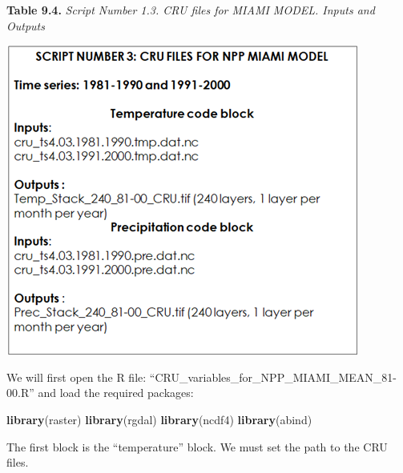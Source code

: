 \documentclass[
  10pt,
  b5paper,
]{book}
\newenvironment{Shaded}{\begin{snugshade}}{\end{snugshade}}
\newcommand{\KeywordTok}[1]{\textcolor[rgb]{0.13,0.29,0.53}{\textbf{#1}}}
\newcommand{\NormalTok}[1]{#1}
\begin{document}
\textbf{Table 9.4.} \emph{Script Number 1.3. CRU files for MIAMI MODEL. Inputs and Outputs}

\includegraphics{tables/Table_9.3.png}

We will first open the R file: ``CRU\_variables\_for\_NPP\_MIAMI\_MEAN\_81-00.R'' and load the required packages:

\begin{Shaded}
\begin{Highlighting}[]
\KeywordTok{library}\NormalTok{(raster)}
\KeywordTok{library}\NormalTok{(rgdal)}
\KeywordTok{library}\NormalTok{(ncdf4)}
\KeywordTok{library}\NormalTok{(abind)}
\end{Highlighting}
\end{Shaded}

The first block is the ``temperature'' block. We must set the path to the CRU files.
\end{document}
